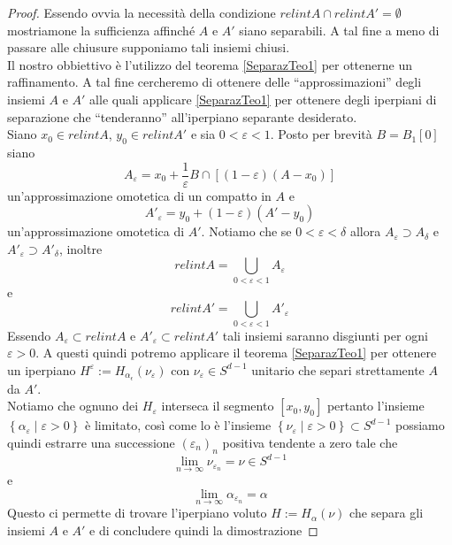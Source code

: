 \documentclass[a4paper,12pt,italian]{article}
\begin{document}
\begin{proof}
Essendo ovvia la necessit\`a della condizione $relintA\cap relintA'=\emptyset$ mostriamone la sufficienza affinch\'e $A$ e $A'$
siano separabili.
A tal fine a meno di passare alle chiusure supponiamo tali insiemi chiusi.\\ Il nostro obbiettivo \`e l'utilizzo del teorema
\ref{SeparazTeo1} per ottenerne un raffinamento. A tal fine cercheremo di ottenere delle ``approssimazioni'' degli insiemi $A$ e $A'$
alle quali applicare \ref{SeparazTeo1} per ottenere degli iperpiani di separazione che ``tenderanno'' all'iperpiano separante desiderato.\\
Siano $x_0\in relintA$, $y_0\in relintA'$ e sia $0<\varepsilon<1$. Posto per brevit\`a $B=B_1[0]$ siano
\begin{equation*}
A_\varepsilon=x_0+\frac{1}{\varepsilon}B\cap\left[(1-\varepsilon)(A-x_0)\right]
\end{equation*}
un'approssimazione omotetica di un compatto in $A$ e 
\begin{equation*}
A'_\varepsilon=y_0+(1-\varepsilon)(A'-y_0)
\end{equation*}
un'approssimazione omotetica di $A'$. Notiamo che se $0<\varepsilon<\delta$ allora $A_\varepsilon\supset A_\delta$ e
$A'_\varepsilon\supset A'_\delta$, inoltre 
\begin{equation*}
relintA=\bigcup_{0<\varepsilon<1}A_\varepsilon
\end{equation*}
e
\begin{equation*}
relintA'=\bigcup_{0<\varepsilon<1}A'_\varepsilon
\end{equation*}
Essendo $A_\varepsilon\subset relintA$ e $A'_\varepsilon\subset relintA'$ tali insiemi saranno disgiunti per ogni $\varepsilon>0$. A questi
quindi potremo applicare il teorema \ref{SeparazTeo1} per ottenere un iperpiano $H^\varepsilon:=H_{\alpha_\epsilon}(\nu_\varepsilon)$
con $\nu_\varepsilon\in S^{d-1}$ unitario che separi strettamente $A$ da $A'$.\\
Notiamo che ognuno dei $H_\varepsilon$ interseca il segmento $\left[x_0,y_0\right]$ pertanto l'insieme
$\left\{\alpha_\varepsilon\mid\varepsilon>0\right\}$ \`e limitato, cos\`i come lo \`e l'insieme
$\left\{\nu_\varepsilon\mid\varepsilon>0\right\}\subset S^{d-1}$ possiamo quindi estrarre una successione $(\varepsilon_n)_n$ positiva
tendente a zero tale che
\begin{equation*}
\lim_{n\to\infty}\nu_{\varepsilon_n}=\nu\in S^{d-1}
\end{equation*}
e
\begin{equation*}
\lim_{n\to\infty}\alpha_{\varepsilon_n}=\alpha
\end{equation*}
Questo ci permette di trovare l'iperpiano voluto $H:=H_\alpha(\nu)$ che separa gli insiemi $A$ e $A'$ e di concludere quindi la dimostrazione
\end{proof}
\end{document}
